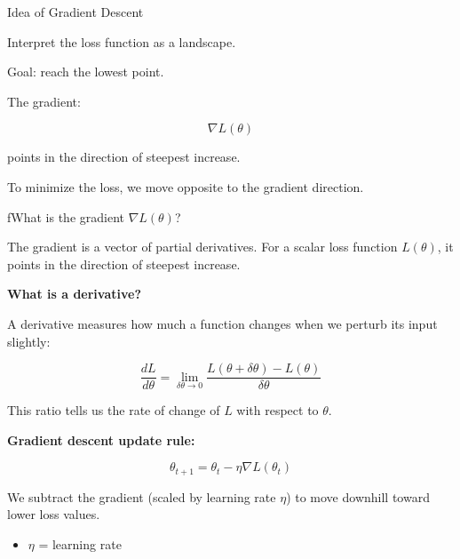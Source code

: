 \documentclass{beamer}
\begin{document}
\begin{frame}{Idea of Gradient Descent}

Interpret the loss function as a landscape.

\vspace{0.3cm}

Goal: reach the lowest point.

\vspace{0.5cm}

The gradient:

\[
\nabla L(\theta)
\]

points in the direction of steepest increase.

\vspace{0.5cm}

To minimize the loss, we move opposite to the gradient direction.

\end{frame}
\begin{frame}f{What is the gradient $\nabla L(\theta)$?}

The gradient is a vector of partial derivatives. For a scalar loss function $L(\theta)$, it points in the direction of steepest increase.

\vspace{0.3cm}

\textbf{What is a derivative?}

A derivative measures how much a function changes when we perturb its input slightly:

\[
\frac{dL}{d\theta} = \lim_{\delta\theta \to 0} \frac{L(\theta + \delta\theta) - L(\theta)}{\delta\theta}
\]

This ratio tells us the rate of change of $L$ with respect to $\theta$.

\vspace{0.3cm}

\textbf{Gradient descent update rule:}

\[
\theta_{t+1} = \theta_t - \eta \nabla L(\theta_t)
\]

We subtract the gradient (scaled by learning rate $\eta$) to move downhill toward lower loss values.

\begin{itemize}
    \item $\eta$ = learning rate
\end{itemize}

\end{frame}
\end{document}
